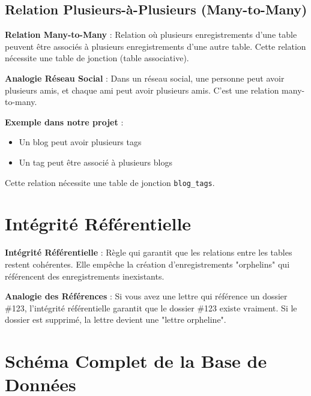 \subsection{Relation Plusieurs-à-Plusieurs (Many-to-Many)}

\begin{definitionbox}
    \textbf{Relation Many-to-Many} : Relation où plusieurs enregistrements d'une table peuvent être associés à plusieurs enregistrements d'une autre table. Cette relation nécessite une table de jonction (table associative).
\end{definitionbox}

\begin{analogybox}
    \textbf{Analogie Réseau Social} : Dans un réseau social, une personne peut avoir plusieurs amis, et chaque ami peut avoir plusieurs amis. C'est une relation many-to-many.
\end{analogybox}

\textbf{Exemple dans notre projet} :
\begin{itemize}
    \item Un blog peut avoir plusieurs tags
    \item Un tag peut être associé à plusieurs blogs
\end{itemize}

Cette relation nécessite une table de jonction \texttt{blog\_tags}.

\section{Intégrité Référentielle}

\begin{definitionbox}
    \textbf{Intégrité Référentielle} : Règle qui garantit que les relations entre les tables restent cohérentes. Elle empêche la création d'enregistrements "orphelins" qui référencent des enregistrements inexistants.
\end{definitionbox}

\begin{analogybox}
    \textbf{Analogie des Références} : Si vous avez une lettre qui référence un dossier \#123, l'intégrité référentielle garantit que le dossier \#123 existe vraiment. Si le dossier est supprimé, la lettre devient une "lettre orpheline".
\end{analogybox}

\section{Schéma Complet de la Base de Données}

